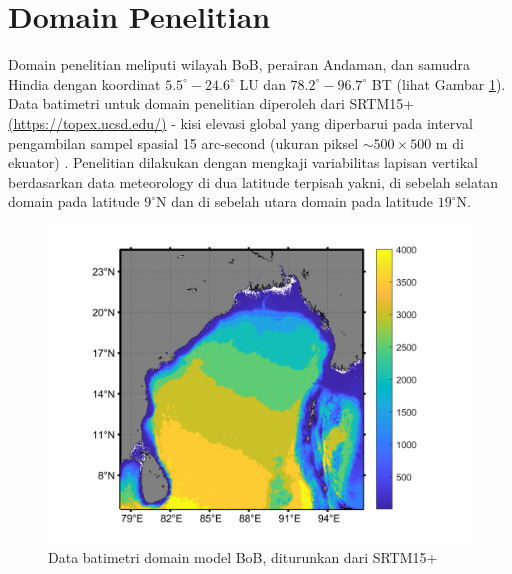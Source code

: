 \vspace{1.5pc}
\section[Domain Penelitian]{Domain Penelitian}
\begin{spacing}{1.5}
	Domain penelitian meliputi wilayah BoB, perairan Andaman, dan samudra Hindia dengan koordinat $5.5^\circ-24.6^\circ$ LU dan $78.2^\circ-96.7^\circ$ BT (lihat Gambar \ref{fig:domain}). Data batimetri untuk domain penelitian diperoleh dari SRTM15+ \href{https://topex.ucsd.edu/pub/archive/srtm15/V1/}{(https://topex.ucsd.edu/)} - kisi elevasi global yang diperbarui pada interval pengambilan sampel spasial 15 arc-second (ukuran piksel $\sim 500 \times 500$ m di ekuator) . Penelitian dilakukan dengan mengkaji variabilitas lapisan vertikal berdasarkan data meteorology di dua latitude terpisah yakni, di sebelah selatan domain pada latitude $9^\circ$N dan di sebelah utara domain pada latitude $19^\circ$N. 
	\begin{figure}[H]
		\centering
		\includegraphics[width=15cm]{contents/bathymetri}
		\caption{Data batimetri domain model BoB, diturunkan dari SRTM15+}
		\label{fig:domain}
	\end{figure}
\end{spacing}
